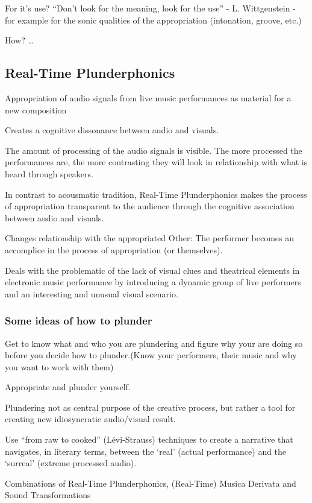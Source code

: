 For it’s use? ``Don’t look for the meaning, look for the use'' - L. Wittgenstein - for example for the sonic qualities of the appropriation (intonation, groove, etc.)

How? …

\subsection{Real-Time Plunderphonics}

Appropriation of audio signals from live music performances as material for a new composition

Creates a cognitive dissonance between audio and visuals.

The amount of processing of the audio signals is visible. The more processed the performances are, the more contrasting they will look in relationship with what is heard through speakers.

In contrast to acousmatic tradition, Real-Time Plunderphonics makes the process of appropriation transparent to the audience through the cognitive association between audio and visuals.

Changes relationship with the appropriated Other: The performer becomes an accomplice in the process of appropriation (or themselves). 

Deals with the problematic of the lack of visual clues and theatrical elements in electronic music performance by introducing a dynamic group of live performers and an interesting and unusual visual scenario.  

\subsubsection{Some ideas of how to plunder}

Get to know what and who you are plundering and figure why your are doing so before you decide how to plunder.(Know your performers, their music and why you want to work with them)

Appropriate and plunder yourself. 

Plundering not as central purpose of the creative process, but rather a tool for creating new idiosyncratic audio/visual result. 

Use ``from raw to cooked'' (L\'{e}vi-Strauss) techniques to create a narrative that navigates, in literary terms, between the ‘real’ (actual performance) and the `surreal' (extreme processed audio).

Combinations of Real-Time Plunderphonics, (Real-Time) Musica Derivata and Sound Transformations

